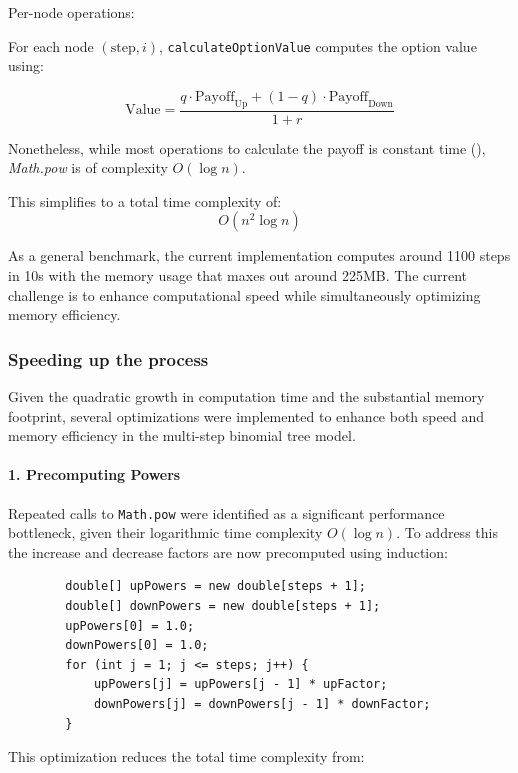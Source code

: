 \documentclass{article}
\begin{document}
    \medbreak
    Per-node operations:

    For each node \( ( \text{step}, i ) \), \texttt{calculateOptionValue} computes the option value using:

    \[
        \text{Value} = \frac{q \cdot \text{Payoff}_{\text{Up}} + (1 - q) \cdot \text{Payoff}_{\text{Down}}}{1 + r}
    \]

    Nonetheless, while most operations to calculate the payoff is constant time (), \emph{Math.pow} is of complexity \( O(\log n) \).

    \bigskip

    This simplifies to a total time complexity of:
    \[
    O(n^2 \log n)
    \]

    As a general benchmark, the current implementation computes around 1100 steps in 10s with the memory usage that maxes out around 225MB.
    The current challenge is to enhance computational speed while simultaneously optimizing memory efficiency.

    \subsubsection{Speeding up the process}

    Given the quadratic growth in computation time and the substantial memory footprint, several optimizations were implemented to enhance both speed and memory efficiency in the multi-step binomial tree model.

    \paragraph{1. Precomputing Powers}
    Repeated calls to \texttt{Math.pow} were identified as a significant performance bottleneck, given their logarithmic time complexity \(O(\log n)\).
    To address this the increase and decrease factors are now precomputed using induction:

    \begin{verbatim}
        double[] upPowers = new double[steps + 1];
        double[] downPowers = new double[steps + 1];
        upPowers[0] = 1.0;
        downPowers[0] = 1.0;
        for (int j = 1; j <= steps; j++) {
            upPowers[j] = upPowers[j - 1] * upFactor;
            downPowers[j] = downPowers[j - 1] * downFactor;
        }
    \end{verbatim}

    This optimization reduces the total time complexity from:
\end{document}
